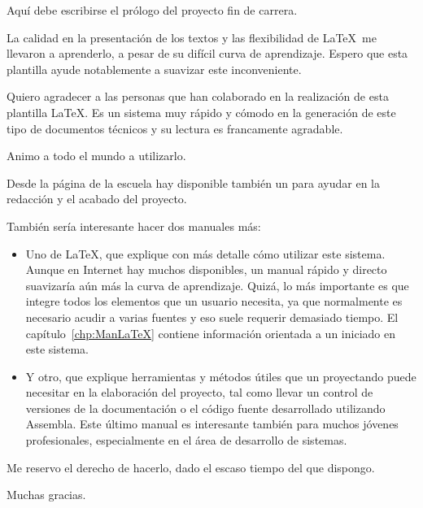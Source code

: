 

  Aquí debe escribirse el prólogo del proyecto fin de carrera.
  \medskip
  
  La calidad en la presentación de los textos y las flexibilidad de \LaTeX\ me llevaron a aprenderlo, a pesar de su difícil curva de aprendizaje.\nli
  Espero que esta plantilla ayude notablemente a suavizar este inconveniente.
  
  Quiero agradecer a las personas que han colaborado en la realización de esta plantilla \LaTeX. Es un sistema muy rápido y cómodo en la generación de este tipo de documentos técnicos y su lectura es francamente agradable.
  
  Animo a todo el mundo a utilizarlo.
  
  Desde la página de la escuela hay disponible también un  para ayudar en la redacción y el acabado del proyecto.

  También sería interesante hacer dos manuales más: 
\begin{itemize}
  \item{Uno de \LaTeX, que explique con más detalle cómo utilizar este sistema. Aunque en Internet hay muchos disponibles, un manual rápido y directo suavizaría aún más la curva de aprendizaje.\nli
    Quizá, lo más importante es que integre todos los elementos que un usuario necesita, ya que normalmente es necesario acudir a varias fuentes y eso suele requerir demasiado tiempo.\nli
    El capítulo~\ref{chp:ManLaTeX} contiene información orientada a un iniciado en este sistema.}
  
  \item{Y otro, que explique herramientas y métodos útiles que un proyectando puede necesitar en la elaboración del proyecto, tal como llevar un control de versiones de la documentación o el código fuente desarrollado utilizando Assembla\TM. Este último manual es interesante también para muchos jóvenes profesionales, especialmente en el área de desarrollo de sistemas.}
\end{itemize}

  Me reservo el derecho de hacerlo, dado el escaso tiempo del que dispongo.
  \bigskip
  
  Muchas gracias.

\chapterend
